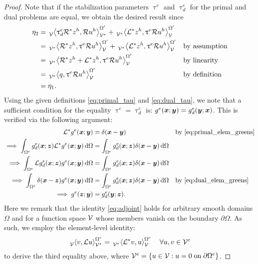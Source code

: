 \begin{proof}
Note that if the stabilization parameters $\uptau^e$ and
$\uptau^e_d$ for the primal and dual problems are equal,
we obtain the desired result since
%
\begin{gather*}
\begin{aligned}
\eta_2 &= 
\,{}_{\mathcal{V}}^{}\!\left< {\uptau^e_d \mathcal{R}^* z^h}, {\mathcal{R} u^h} \right>_{\mathcal{V}^*}^{\Omega'} +
\,{}_{\mathcal{V}^*}^{}\!\left< {\mathcal{L}^* z^h}, {\uptau^e \mathcal{R} u^h} \right>_{\mathcal{V}}^{\Omega'}
&&\\
&= \,{}_{\mathcal{V}^*}^{}\!\left< {\mathcal{R}^* z^h}, {\uptau^e \mathcal{R} u^h} \right>_{\mathcal{V}}^{\Omega'} +
\,{}_{\mathcal{V}^*}^{}\!\left< {\mathcal{L}^* z^h}, {\uptau^e \mathcal{R} u^h} \right>_{\mathcal{V}}^{\Omega'}
&&\text{by assumption} \\
&= \,{}_{\mathcal{V}^*}^{}\!\left< {\mathcal{R}^* z^h + \mathcal{L}^* z^h}, {\uptau^e \mathcal{R} u^h} \right>_{\mathcal{V}}^{\Omega'}
&&\text{by linearity} \\
&= \,{}_{\mathcal{V}^*}^{}\!\left< {q}, {\uptau^e \mathcal{R} u^h} \right>_{\mathcal{V}}^{\Omega'}
&&\text{by definition} \\
&= \eta_1.
&&
\end{aligned}
\end{gather*}
%
Using the given definitions \eqref{eq:primal_tau}
and \eqref{eq:dual_tau}, we note that a sufficient
condition for the equality $\uptau^e = \uptau^e_d$
is:
$g^e(\boldsymbol{x}; \boldsymbol{y}) = g^e_d(\boldsymbol{y}; \boldsymbol{x})$.
This is verified via the following argument:
%
\begin{gather*}
\begin{aligned}
\mathcal{L}^* g^e(\boldsymbol{x}; \boldsymbol{y})
&=
\delta(\boldsymbol{x} - \boldsymbol{y})
&& \text{by \eqref{eq:primal_elem_greens}} \\
\implies
\int_{\Omega^e}
g^e_d(\boldsymbol{x}; \boldsymbol{z}) \mathcal{L}^* g^e(\boldsymbol{x}; \boldsymbol{y})
\, \text{d} \Omega
&=
\int_{\Omega^e}
g^e_d(\boldsymbol{x}; \boldsymbol{z}) \delta(\boldsymbol{x} - \boldsymbol{y})
\, \text{d} \Omega
&& \\
\implies
\int_{\Omega^e}
\mathcal{L} g^e_d(\boldsymbol{x}; \boldsymbol{z}) g^e(\boldsymbol{x}; \boldsymbol{y})
\, \text{d} \Omega
&=
\int_{\Omega^e}
g^e_d(\boldsymbol{x}; \boldsymbol{z}) \delta(\boldsymbol{x} - \boldsymbol{y})
\, \text{d} \Omega
&& \\
\implies
\int_{\Omega^e}
\delta(\boldsymbol{x} - \boldsymbol{z}) g^e(\boldsymbol{x}; \boldsymbol{y})
\, \text{d} \Omega
&=
\int_{\Omega^e}
g^e_d(\boldsymbol{x}; \boldsymbol{z}) \delta(\boldsymbol{x} - \boldsymbol{y})
\, \text{d} \Omega
&& \text{by \eqref{eq:dual_elem_greens}} \\
\implies
g^e(\boldsymbol{z}; \boldsymbol{y}) &= g^e_d(\boldsymbol{y}; \boldsymbol{z}).
\end{aligned}
\end{gather*}
%
Here we remark that the identity \eqref{eq:adjoint}
holds for arbitrary smooth domains $\Omega$ and for
a function space $\mathcal{V}$ whose members vanish on the
boundary $\partial \Omega$. As such,
we employ the element-level identity:
%
\begin{gather}
\,{}_{\mathcal{V}}^{}\!\left< {v}, {\mathcal{L} u} \right>_{\mathcal{V}^*}^{\Omega^e} =
\,{}_{\mathcal{V}^*}^{}\!\left< {\mathcal{L}^*v}, {u} \right>_{\mathcal{V}}^{\Omega^e}
\quad \forall u,v \in \mathcal{V}^e
\end{gather}
%
to derive the third equality above, where
$\mathcal{V}^e = \{ u \in \mathcal{V} : u = 0 \; \text{on} \; \partial \Omega^e \}$.
\end{proof}

